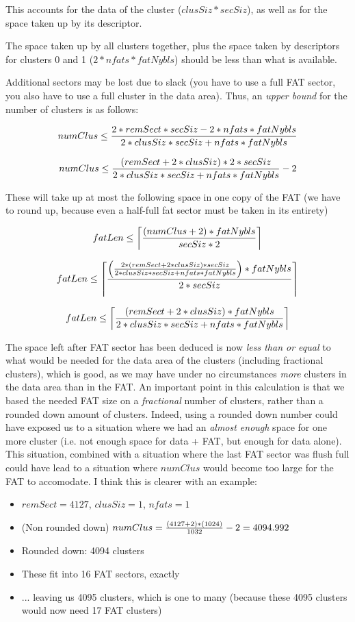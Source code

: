 \documentclass[a4paper,12pt]{article}
\begin{document}
This accounts for the data of the cluster ($clusSiz * secSiz$),
as well as for the space taken up by its descriptor.

The space taken up by all clusters together, plus the space taken by
descriptors for clusters 0 and 1 ($2*nfats*fatNybls$) should be less
than what is available.

Additional sectors may be lost due to slack (you have to use a full
FAT sector, you also have to use a full cluster in the data
area). Thus, an {\em upper bound} for the number of clusters is as
follows:

$$
numClus \le  {2*remSect*secSiz - 2*nfats*fatNybls \over
2*clusSiz*secSiz + nfats*fatNybls}
$$

	                        
$$
numClus \le {(remSect+2*clusSiz)*2*secSiz \over
2*clusSiz*secSiz + nfats*fatNybls} - 2
$$

	   
These will take up at most the following space in one copy of the FAT
(we have to round up, because even a half-full fat sector must be
taken in its entirety)

$$
fatLen \le \left\lceil {  (numClus+2)*fatNybls \over secSiz * 2 } \right\rceil
$$


$$
fatLen \le \left\lceil {
\left( { 2*(remSect+2*clusSiz)*secSiz \over
2*clusSiz*secSiz + nfats*fatNybls} \right) * fatNybls \over
2*secSiz 
} \right\rceil
$$


$$
fatLen \le \left\lceil {
(remSect+2*clusSiz)* fatNybls \over
2*clusSiz*secSiz + nfats*fatNybls
} \right\rceil
$$

The space left after FAT sector has been deduced is now {\em less than
or equal} to what would be needed for the data area of the clusters
(including fractional clusters), which is good, as we may have under
no circumstances {\em more} clusters in the data area than in the FAT.
An important point in this calculation is that we based the needed FAT
size on a {\em fractional} number of clusters, rather than a rounded
down amount of clusters. Indeed, using a rounded down number could
have exposed us to a situation where we had an {\em almost enough}
space for one more cluster (i.e. not enough space for data + FAT, but
enough for data alone). This situation, combined with a situation
where the last FAT sector was flush full could have lead to a
situation where $numClus$ would become too large for the FAT to
accomodate. I think this is clearer with an example:
\begin{itemize}
\item $remSect=4127$, $clusSiz=1$, $nfats=1$
\item (Non rounded down) $numClus={(4127+2)*(1024) \over 1032} -
2 =4094.992$
\item Rounded down: 4094 clusters
\item These fit into 16 FAT sectors, exactly
\item ... leaving us 4095 clusters, which is one to many (because
these 4095 clusters would now need 17 FAT clusters)
\end{itemize}
\end{document}
